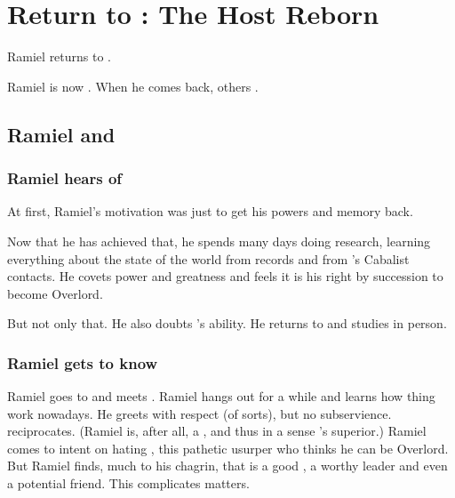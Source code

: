 \section[Return to Mystraacht]{Return to \Mystraacht: The Host Reborn}
Ramiel returns to \Mystraacht. 


Ramiel is now .
When he comes back, others . 





\subsection{Ramiel and \Dasteron}





\subsubsection{Ramiel hears of \Dasteron}
At first, Ramiel's motivation was just to get his powers and memory back. 

Now that he has achieved that, he spends many days doing research, learning everything about the state of the world from records and from \Cishiel's Cabalist contacts.
He covets power and greatness and feels it is his right by succession to become Overlord.

But not only that.
He also doubts \Dasteron's ability.
He returns to \Mystraacht and studies \Dasteron in person.





\subsubsection{Ramiel gets to know \Dasteron}
Ramiel goes to \Mystraacht and meets \Dasteron.
Ramiel hangs out for a while and learns how thing work nowadays.
He greets \Dasteron with respect (of sorts), but no subservience.
\Dasteron reciprocates. (Ramiel is, after all, a \sathariah, and thus in a sense \Dasteron's superior.)
Ramiel comes to \Mystraacht intent on hating \Dasteron, this pathetic usurper who thinks he can be Overlord.
But Ramiel finds, much to his chagrin, that \Dasteron is a good \resphan, a worthy leader and even a potential friend.
This complicates matters.





